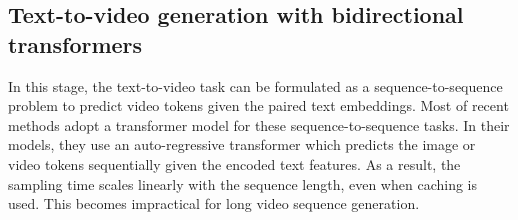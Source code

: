 


\subsection{Text-to-video generation with bidirectional transformers}
In this stage, the text-to-video task can be formulated as a sequence-to-sequence problem to predict video tokens given the paired text embeddings. Most of recent methods \citep{DALLE, PARTI, nuwa, cogvideo} adopt a  transformer model for these sequence-to-sequence tasks. In their models, they use an auto-regressive transformer which predicts the image or video tokens sequentially given the encoded text features.
As a result, the sampling time scales linearly with the sequence length, even when caching is used. This becomes impractical for long video sequence generation. 

